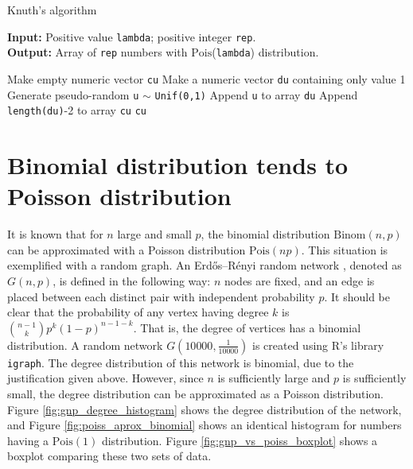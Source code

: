 \documentclass[letterpaper, 10 pt, conference]{article}
\begin{document}
\begin{algorithm}
	\caption{Knuth's algorithm}
	\begin{flushleft}
		\textbf{Input: } Positive value \texttt{lambda}; positive integer \texttt{rep}.
		\\ \textbf{Output: } Array of \texttt{rep} numbers with $\mathrm{Pois}$(\texttt{lambda}) distribution.
	\end{flushleft}
	
	\begin{algorithmic}[1]
		\State Make empty numeric vector \texttt{cu}
		\State Make a numeric vector \texttt{du} containing only value 1
		\State Generate pseudo-random \texttt{u} $\sim$ \texttt{Unif(0,1)}
		\State Append \texttt{u} to array \texttt{du}
		\EndWhile
		\State Append \texttt{length(du)}-2 to array \texttt{cu}
		\EndFor
		\State \Return \texttt{cu}
	\end{algorithmic}
	\label{algo:knuth}
\end{algorithm}

\section{Binomial distribution tends to Poisson distribution}
It is known \cite{Ross_1976} that for $n$ large and small $p$, the binomial distribution $\mathrm{Binom}(n, p)$ can be approximated with a Poisson distribution $\mathrm{Pois}(np)$. This situation is exemplified with a random graph. An Erdős–Rényi random network \cite{newman}, denoted as $G(n, p)$, is defined in the following way: $n$ nodes are fixed, and an edge is placed between each distinct pair with independent probability $p$. It should be clear that the probability of any vertex having degree $k$ is ${n-1 \choose k} p^k (1-p)^{n-1-k}$. That is, the degree of vertices has a binomial distribution. A random network $G(10 000, \frac{1}{10 000})$ is created using R's library \texttt{igraph}. The degree distribution of this network is binomial, due to the justification given above. However, since $n$ is sufficiently large and $p$ is sufficiently small, the degree distribution can be approximated as a Poisson distribution. Figure \ref{fig:gnp_degree_histogram} shows the degree distribution of the network, and Figure \ref{fig:poiss_aprox_binomial} shows an identical histogram for numbers having a $\mathrm{Pois}(1)$ distribution. Figure \ref{fig:gnp_vs_poiss_boxplot} shows a boxplot comparing these two sets of data.
\end{document}
